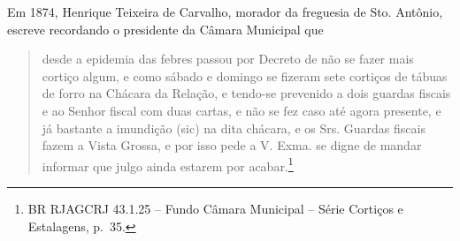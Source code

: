 Em 1874, Henrique Teixeira de Carvalho, morador da freguesia de Sto.
Antônio, escreve recordando o presidente da Câmara Municipal que

\begin{quote}
desde a epidemia das febres passou por Decreto de não se fazer mais
cortiço algum, e como sábado e domingo se fizeram sete cortiços de
tábuas de forro na Chácara da Relação, e tendo-se prevenido a dois
guardas fiscais e ao Senhor fiscal com duas cartas, e não se fez caso
até agora presente, e já bastante a imundição (sic) na dita chácara, e
os Srs. Guardas fiscais fazem a Vista Grossa, e por isso pede a V. Exma.
se digne de mandar informar que julgo ainda estarem por
acabar.\footnote{BR RJAGCRJ 43.1.25 -- Fundo Câmara Municipal -- Série
  Cortiços e Estalagens, p.~35.}
\end{quote}


